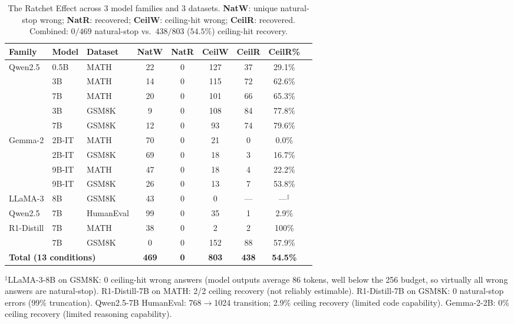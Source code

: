 \documentclass{article}
\begin{document}
\begin{table}[t]
\centering
\caption{The Ratchet Effect across 3 model families and 3 datasets. \textbf{NatW}: unique natural-stop wrong; \textbf{NatR}: recovered; \textbf{CeilW}: ceiling-hit wrong; \textbf{CeilR}: recovered. Combined: $0/469$ natural-stop vs.\ $438/803$ ($54.5\%$) ceiling-hit recovery.}
\label{tab:ratchet}
\begin{tabular}{lllcccccc}
\toprule
\textbf{Family} & \textbf{Model} & \textbf{Dataset} & \textbf{NatW} & \textbf{NatR} & \textbf{CeilW} & \textbf{CeilR} & \textbf{CeilR\%} \\
\midrule
\multirow{5}{*}{Qwen2.5} & 0.5B & MATH & 22 & 0 & 127 & 37 & 29.1\% \\
 & 3B & MATH & 14 & 0 & 115 & 72 & 62.6\% \\
 & 7B & MATH & 20 & 0 & 101 & 66 & 65.3\% \\
 & 3B & GSM8K & 9 & 0 & 108 & 84 & 77.8\% \\
 & 7B & GSM8K & 12 & 0 & 93 & 74 & 79.6\% \\
\midrule
\multirow{4}{*}{Gemma-2} & 2B-IT & MATH & 70 & 0 & 21 & 0 & 0.0\% \\
 & 2B-IT & GSM8K & 69 & 0 & 18 & 3 & 16.7\% \\
 & 9B-IT & MATH & 47 & 0 & 18 & 4 & 22.2\% \\
 & 9B-IT & GSM8K & 26 & 0 & 13 & 7 & 53.8\% \\
\midrule
LLaMA-3 & 8B & GSM8K & 43 & 0 & 0 & --- & ---$^{\ddagger}$ \\
\midrule
\multirow{1}{*}{Qwen2.5} & 7B & HumanEval & 99 & 0 & 35 & 1 & 2.9\% \\
\midrule
R1-Distill & 7B & MATH & 38 & 0 & 2 & 2 & 100\% \\
 & 7B & GSM8K & 0 & 0 & 152 & 88 & 57.9\% \\
\midrule
\multicolumn{3}{l}{\textbf{Total (13 conditions)}} & \textbf{469} & \textbf{0} & \textbf{803} & \textbf{438} & \textbf{54.5\%} \\
\bottomrule
\end{tabular}
\vspace{1mm}

\raggedright\small $^{\ddagger}$LLaMA-3-8B on GSM8K: 0 ceiling-hit wrong answers (model outputs average 86 tokens, well below the 256 budget, so virtually all wrong answers are natural-stop). R1-Distill-7B on MATH: 2/2 ceiling recovery (not reliably estimable). R1-Distill-7B on GSM8K: 0 natural-stop errors (99\% truncation). Qwen2.5-7B HumanEval: 768$\to$1024 transition; 2.9\% ceiling recovery (limited code capability). Gemma-2-2B: 0\% ceiling recovery (limited reasoning capability).
\end{table}
\end{document}
